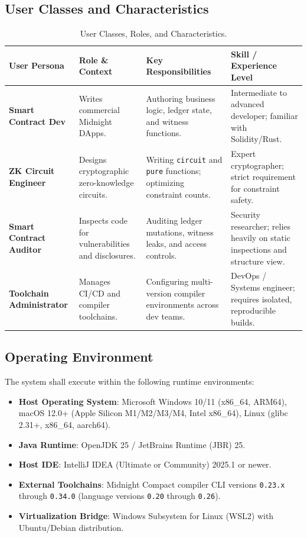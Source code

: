 \subsection{User Classes and Characteristics}
\begin{table}[htbp]
    \centering
    \small
    \begin{tabularx}{\textwidth}{l p{3.2cm} p{4.2cm} p{3.2cm}}
        \toprule
        \textbf{User Persona} & \textbf{Role \& Context} & \textbf{Key Responsibilities} & \textbf{Skill / Experience Level} \\
        \midrule
        \textbf{Smart Contract Dev} & Writes commercial Midnight DApps. & Authoring business logic, ledger state, and witness functions. & Intermediate to advanced developer; familiar with Solidity/Rust. \\
        \textbf{ZK Circuit Engineer} & Designs cryptographic zero-knowledge circuits. & Writing \texttt{circuit} and \texttt{pure} functions; optimizing constraint counts. & Expert cryptographer; strict requirement for constraint safety. \\
        \textbf{Smart Contract Auditor} & Inspects code for vulnerabilities and disclosures. & Auditing ledger mutations, witness leaks, and access controls. & Security researcher; relies heavily on static inspections and structure view. \\
        \textbf{Toolchain Administrator} & Manages CI/CD and compiler toolchains. & Configuring multi-version compiler environments across dev teams. & DevOps / Systems engineer; requires isolated, reproducible builds. \\
        \bottomrule
    \end{tabularx}
    \caption{User Classes, Roles, and Characteristics.}
    \label{tab:user_classes}
\end{table}

\subsection{Operating Environment}
The system shall execute within the following runtime environments:
\begin{itemize}
    \item \textbf{Host Operating System}: Microsoft Windows 10/11 (x86\_64, ARM64), macOS 12.0+ (Apple Silicon M1/M2/M3/M4, Intel x86\_64), Linux (glibc 2.31+, x86\_64, aarch64).
    \item \textbf{Java Runtime}: OpenJDK 25 / JetBrains Runtime (JBR) 25.
    \item \textbf{Host IDE}: IntelliJ IDEA (Ultimate or Community) 2025.1 or newer.
    \item \textbf{External Toolchains}: Midnight Compact compiler CLI versions \texttt{0.23.x} through \texttt{0.34.0} (language versions \texttt{0.20} through \texttt{0.26}).
    \item \textbf{Virtualization Bridge}: Windows Subsystem for Linux (WSL2) with Ubuntu/Debian distribution.
\end{itemize}

